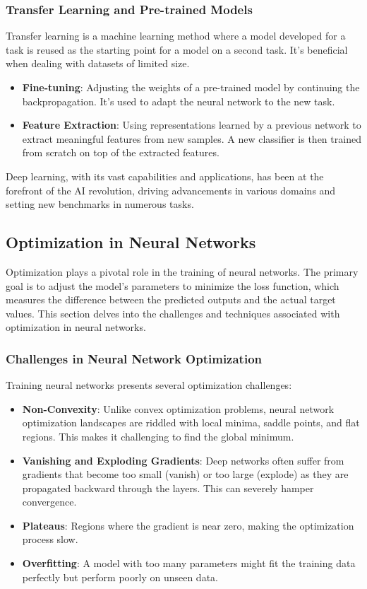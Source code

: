 \subsubsection{Transfer Learning and Pre-trained Models}

Transfer learning is a machine learning method where a model developed for a task is reused as the starting point for a model on a second task. It's beneficial when dealing with datasets of limited size.

\begin{itemize}
    \item \textbf{Fine-tuning}: Adjusting the weights of a pre-trained model by continuing the backpropagation. It's used to adapt the neural network to the new task.
    \item \textbf{Feature Extraction}: Using representations learned by a previous network to extract meaningful features from new samples. A new classifier is then trained from scratch on top of the extracted features.
\end{itemize}

Deep learning, with its vast capabilities and applications, has been at the forefront of the AI revolution, driving advancements in various domains and setting new benchmarks in numerous tasks.

\subsection{Optimization in Neural Networks}

Optimization plays a pivotal role in the training of neural networks. The primary goal is to adjust the model's parameters to minimize the loss function, which measures the difference between the predicted outputs and the actual target values. This section delves into the challenges and techniques associated with optimization in neural networks.

\subsubsection{Challenges in Neural Network Optimization}

Training neural networks presents several optimization challenges:

\begin{itemize}
    \item \textbf{Non-Convexity}: Unlike convex optimization problems, neural network optimization landscapes are riddled with local minima, saddle points, and flat regions. This makes it challenging to find the global minimum.
    \item \textbf{Vanishing and Exploding Gradients}: Deep networks often suffer from gradients that become too small (vanish) or too large (explode) as they are propagated backward through the layers. This can severely hamper convergence.
    \item \textbf{Plateaus}: Regions where the gradient is near zero, making the optimization process slow.
    \item \textbf{Overfitting}: A model with too many parameters might fit the training data perfectly but perform poorly on unseen data.
\end{itemize}

